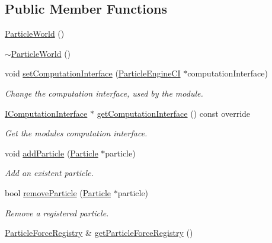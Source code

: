 \subsection*{Public Member Functions}
\begin{DoxyCompactItemize}
\item 
\mbox{\hyperlink{classr3_1_1_particle_world_a5cd4bf68559cd0e1194420d3233b095e}{Particle\+World}} ()
\item 
\mbox{\hyperlink{classr3_1_1_particle_world_a3a6d6f87b726156c41d4282c6dbb1e48}{$\sim$\+Particle\+World}} ()
\item 
void \mbox{\hyperlink{classr3_1_1_particle_world_adf5630d53659e9ced254d33990f15a9d}{set\+Computation\+Interface}} (\mbox{\hyperlink{classr3_1_1_particle_engine_c_i}{Particle\+Engine\+CI}} $\ast$computation\+Interface)
\begin{DoxyCompactList}\small\item\em Change the computation interface, used by the module. \end{DoxyCompactList}\item 
\mbox{\hyperlink{classr3_1_1_i_computation_interface}{I\+Computation\+Interface}} $\ast$ \mbox{\hyperlink{classr3_1_1_particle_world_a1e806bf89ec6445a54b9534f1efc081f}{get\+Computation\+Interface}} () const override
\begin{DoxyCompactList}\small\item\em Get the module\textquotesingle{}s computation interface. \end{DoxyCompactList}\item 
void \mbox{\hyperlink{classr3_1_1_particle_world_a89baf289522c69ad7d4be95594317269}{add\+Particle}} (\mbox{\hyperlink{classr3_1_1_particle}{Particle}} $\ast$particle)
\begin{DoxyCompactList}\small\item\em Add an existent particle. \end{DoxyCompactList}\item 
bool \mbox{\hyperlink{classr3_1_1_particle_world_a7c2b9a7345016ad344d4439d807dadc3}{remove\+Particle}} (\mbox{\hyperlink{classr3_1_1_particle}{Particle}} $\ast$particle)
\begin{DoxyCompactList}\small\item\em Remove a registered particle. \end{DoxyCompactList}\item 
\mbox{\hyperlink{classr3_1_1_particle_force_registry}{Particle\+Force\+Registry}} \& \mbox{\hyperlink{classr3_1_1_particle_world_aaa3f952fdfd8862673d41afa078245bf}{get\+Particle\+Force\+Registry}} ()

\end{DoxyCompactItemize}

